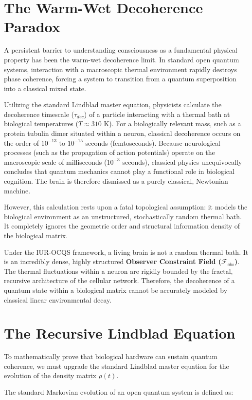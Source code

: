\documentclass[12pt,openany]{book}
\begin{document}
\section{The Warm-Wet Decoherence Paradox}
A persistent barrier to understanding consciousness as a fundamental physical property has been the warm-wet decoherence limit. In standard open quantum systems, interaction with a macroscopic thermal environment rapidly destroys phase coherence, forcing a system to transition from a quantum superposition into a classical mixed state. 

Utilizing the standard Lindblad master equation, physicists calculate the decoherence timescale ($\tau_{dec}$) of a particle interacting with a thermal bath at biological temperatures ($T \approx 310$ K). For a biologically relevant mass, such as a protein tubulin dimer situated within a neuron, classical decoherence occurs on the order of $10^{-13}$ to $10^{-15}$ seconds (femtoseconds). Because neurological processes (such as the propagation of action potentials) operate on the macroscopic scale of milliseconds ($10^{-3}$ seconds), classical physics unequivocally concludes that quantum mechanics cannot play a functional role in biological cognition. The brain is therefore dismissed as a purely classical, Newtonian machine.

However, this calculation rests upon a fatal topological assumption: it models the biological environment as an unstructured, stochastically random thermal bath. It completely ignores the geometric order and structural information density of the biological matrix.

Under the IUR-OCQS framework, a living brain is not a random thermal bath. It is an incredibly dense, highly structured \textbf{Observer Constraint Field ($\mathcal{F}_{obs}$)}. The thermal fluctuations within a neuron are rigidly bounded by the fractal, recursive architecture of the cellular network. Therefore, the decoherence of a quantum state within a biological matrix cannot be accurately modeled by classical linear environmental decay.

\section{The Recursive Lindblad Equation}
To mathematically prove that biological hardware can sustain quantum coherence, we must upgrade the standard Lindblad master equation for the evolution of the density matrix $\rho(t)$. 

The standard Markovian evolution of an open quantum system is defined as:
\end{document}
